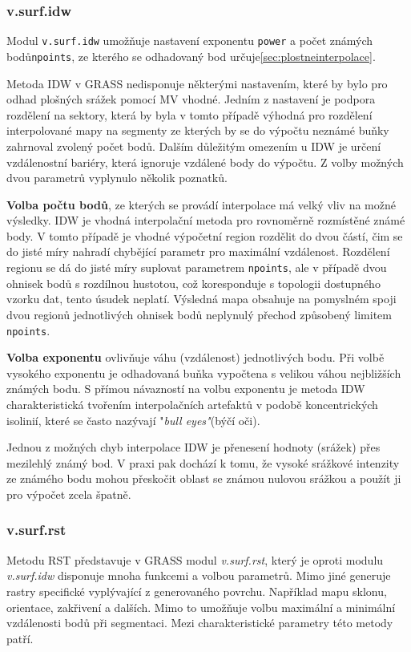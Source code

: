 \documentclass[a4paper,12pt,oneside]{report}
\begin{document}
\subsubsection*{v.surf.idw}
Modul \texttt{v.surf.idw} umožňuje nastavení exponentu \texttt{power} a počet známých bodů\texttt{npoints}, ze kterého se odhadovaný bod určuje\ref{sec:plostneinterpolace}. 

Metoda IDW v GRASS nedisponuje některými nastavením, které by bylo pro odhad plošných srážek pomocí MV vhodné. Jedním z nastavení je podpora rozdělení na sektory, která by byla v tomto případě výhodná pro rozdělení interpolované mapy na segmenty ze kterých  by se do výpočtu neznámé buňky zahrnoval zvolený počet bodů. Dalším důležitým omezením u IDW je určení vzdálenostní bariéry, která ignoruje vzdálené body do výpočtu. Z volby možných dvou parametrů vyplynulo několik poznatků.

\begin{description}
\item \textbf{Volba počtu bodů}, ze kterých se provádí interpolace má velký vliv na možné výsledky. IDW je vhodná interpolační metoda pro rovnoměrně rozmístěné známé body. V tomto případě je vhodné výpočetní region rozdělit do dvou částí, čim se  do jisté míry nahradí chybějící parametr pro maximální vzdálenost. Rozdělení regionu se dá do jisté míry suplovat parametrem \texttt{npoints}, ale v případě dvou ohnisek bodů s rozdílnou hustotou, což koresponduje s topologii dostupného vzorku dat, tento úsudek neplatí. Výsledná mapa obsahuje na pomyslném spoji dvou regionů jednotlivých ohnisek bodů neplynulý přechod způsobený limitem \texttt{npoints}.
\item \textbf{Volba exponentu} ovlivňuje váhu (vzdálenost) jednotlivých bodu. Při volbě vysokého exponentu je odhadovaná buňka vypočtena s velikou váhou nejbližších známých bodu. S přímou návazností na volbu exponentu je  metoda IDW charakteristická tvořením interpolačních artefaktů v podobě koncentrických isolinií, které se často nazývají "\textit{bull eyes"}(býčí oči). 
\end{description} 



Jednou z možných chyb interpolace IDW je přenesení hodnoty (srážek) přes mezilehlý známý bod. V praxi pak dochází k tomu, že vysoké srážkové intenzity ze známého bodu mohou přeskočit oblast  se známou nulovou srážkou a použít ji pro výpočet zcela špatně.



\subsubsection*{v.surf.rst}
Metodu RST představuje v GRASS modul \textit{v.surf.rst}, který je oproti modulu \textit{v.surf.idw} disponuje mnoha funkcemi a volbou parametrů. Mimo jiné generuje rastry specifické vyplývající z generovaného povrchu. Například mapu sklonu, orientace, zakřivení a dalších. Mimo to umožňuje volbu maximální a minimální vzdálenosti bodů při segmentaci. Mezi charakteristické parametry této metody patří.
\end{document}
